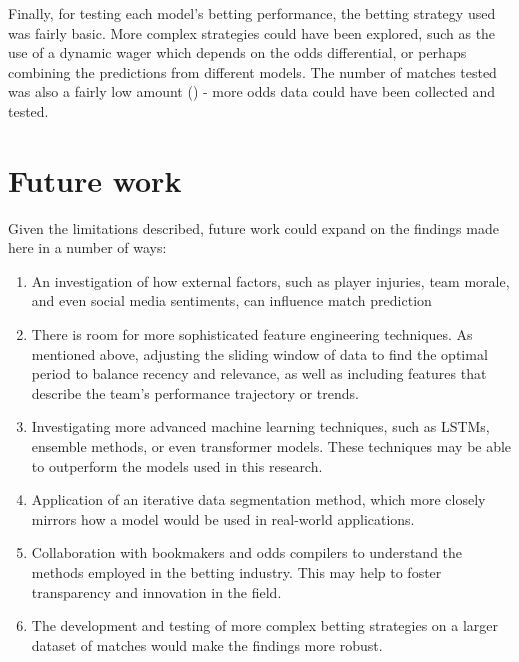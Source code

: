 Finally, for testing each model's betting performance, the betting strategy used was fairly basic. More complex strategies could have been explored, such as the use of a dynamic wager which depends on the odds differential, or perhaps combining the predictions from different models. The number of matches tested was also a fairly low amount (\matchesBet{}) - more odds data could have been collected and tested.

\section{Future work}

Given the limitations described, future work could expand on the findings made here in a number of ways:

\begin{enumerate}
	\item An investigation of how external factors, such as player injuries, team morale, and even social media sentiments, can influence match prediction
	\item There is room for more sophisticated feature engineering techniques. As mentioned above, adjusting the sliding window of data to find the optimal period to balance recency and relevance, as well as including features that describe the team's performance trajectory or trends.
	\item Investigating more advanced machine learning techniques, such as LSTMs, ensemble methods, or even transformer models. These techniques may be able to outperform the models used in this research.
	\item Application of an iterative data segmentation method, which more closely mirrors how a model would be used in real-world applications.
	\item Collaboration with bookmakers and odds compilers to understand the methods employed in the betting industry. This may help to foster transparency and innovation in the field.
	\item The development and testing of more complex betting strategies on a larger dataset of matches would make the findings more robust.
\end{enumerate}